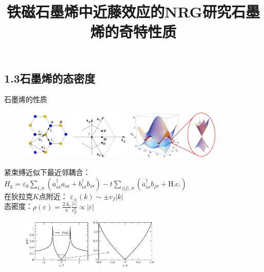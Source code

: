 \documentclass[9pt,t]{beamer} %
\begin{document}
\subsection{1.3石墨烯的态密度}
\title{铁磁石墨烯中近藤效应的NRG研究\qquad \qquad \qquad 石墨烯的奇特性质}
\begin{frame}{石墨烯的性质}
\begin{figure}
\includegraphics[width=0.47\textwidth]{graphene2.png}
\includegraphics[width=0.4\textwidth]{graphene1.png}
\end{figure}
紧束缚近似下最近邻耦合：
$H_{\mathrm{g}}=\varepsilon_{0}\sum_{i, \sigma}\left(a_{i \sigma}^{\dagger} a_{i \sigma}+b_{i \sigma}^{\dagger} b_{i \sigma}\right) - t \sum_{\langle i j\rangle, \sigma} \left(a_{i \sigma}^{\dagger} b_{j \sigma}+\mathrm{H.c.}\right)$\\
在狄拉克$K$点附近： \qquad \qquad \qquad \quad $\varepsilon_{\pm}(k)\sim \pm v_f |k|$\\
态密度：\qquad \qquad \qquad \qquad \qquad \qquad  $\rho(\varepsilon)=\frac{2 A_{c}}{\pi} \frac{|\varepsilon|}{v_{F}^{2}}\propto |\varepsilon|$
\begin{figure}
\includegraphics[width=0.6\textwidth]{graphene-dos.png}
\end{figure}
\end{frame}
\end{document}
